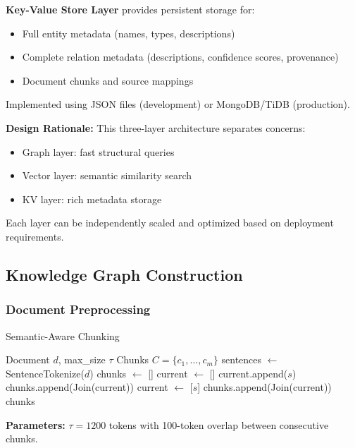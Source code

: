 \documentclass[11pt,a4paper]{article}
\begin{document}
\textbf{Key-Value Store Layer} provides persistent storage for:
\begin{itemize}
    \item Full entity metadata (names, types, descriptions)
    \item Complete relation metadata (descriptions, confidence scores, provenance)
    \item Document chunks and source mappings
\end{itemize}

Implemented using JSON files (development) or MongoDB/TiDB (production).

\textbf{Design Rationale:} This three-layer architecture separates concerns:
\begin{itemize}
    \item Graph layer: fast structural queries
    \item Vector layer: semantic similarity search
    \item KV layer: rich metadata storage
\end{itemize}

Each layer can be independently scaled and optimized based on deployment requirements.

\subsection{Knowledge Graph Construction}

\subsubsection{Document Preprocessing}

\begin{algorithm}
\caption{Semantic-Aware Chunking}
\begin{algorithmic}[1]
\REQUIRE Document $d$, max\_size $\tau$
\ENSURE Chunks $C = \{c_1, \ldots, c_m\}$
\STATE sentences $\leftarrow$ SentenceTokenize($d$)
\STATE chunks $\leftarrow$ []
\STATE current $\leftarrow$ []
        \STATE current.append($s$)
    \ELSE
        \STATE chunks.append(Join(current))
        \STATE current $\leftarrow$ [$s$]
    \ENDIF
\ENDFOR
\STATE chunks.append(Join(current))
\RETURN chunks
\end{algorithmic}
\end{algorithm}

\textbf{Parameters:} $\tau = 1200$ tokens with 100-token overlap between consecutive chunks.
\end{document}
